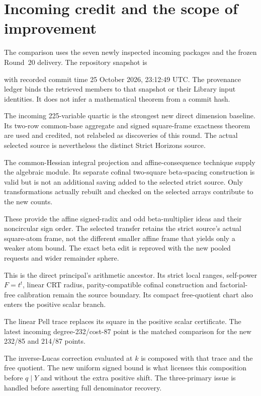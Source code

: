 \section{Incoming credit and the scope of improvement}
\label{sec:comparison}
The comparison uses the seven newly inspected incoming packages and the
frozen Round~20 delivery. The repository snapshot is
\begin{center}\small
{}
\end{center}
with recorded commit time 25 October 2026, 23:12:49 UTC.
The provenance ledger binds the retrieved members to that snapshot or
their Library input identities. It does not infer a mathematical theorem
from a commit hash.

\begin{description}[style=nextline,leftmargin=1.5em]
\item[Pooled Powers]
The incoming 225-variable quartic is the strongest new direct dimension
baseline. Its two-row common-base aggregate and signed square-frame
exactness theorem are used and credited, not relabeled as discoveries
of this round. The actual selected source is nevertheless the distinct
Strict Horizons source.
\item[Quadratic Projection 234]
The common-Hessian integral projection and affine-consequence technique
supply the algebraic module. Its separate cofinal two-square beta-spacing
construction is valid but is not an additional saving added to the
selected strict source. Only transformations actually rebuilt and checked
on the selected arrays contribute to the new counts.
\item[Affine Bootstraps and Affine Certificates]
These provide the affine signed-radix and odd beta-multiplier ideas and
their noncircular sign order. The selected transfer retains the strict
source's actual square-atom frame, not the different smaller affine
frame that yields only a weaker atom bound. The exact beta edit is
reproved with the new pooled requests and wider remainder sphere.
\item[Strict Horizons]
This is the direct principal's arithmetic ancestor. Its strict local
ranges, self-power $F=t^t$, linear CRT radius, parity-compatible cofinal
construction and factorial-free calibration remain the source boundary.
Its compact free-quotient chart also enters the positive scalar branch.
\item[Trace Radical]
The linear Pell trace replaces its square in the positive scalar
certificate. The latest incoming degree-232/cost-87 point is the matched
comparison for the new 232/85 and 214/87 points.
\item[Unsquared Factors and Linear Selectors]
The inverse-Lucas correction evaluated at $k$ is composed with that
trace and the free quotient. The new uniform signed bound is what
licenses this composition before $q\mid Y$ and without the extra
positive shift. The three-primary issue is handled before asserting
full denominator recovery.
\end{description}
